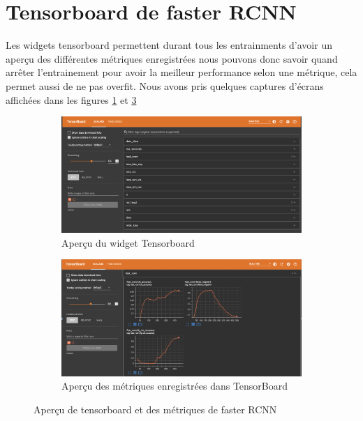 \section{Tensorboard de faster RCNN }\label{anal:train_rcnn}
Les widgets tensorboard permettent durant tous les entrainments d'avoir un aperçu des différentes métriques enregistrées nous pouvons donc savoir quand arrêter l'entrainement pour avoir la meilleur performance selon une métrique, cela permet aussi de ne pas overfit. Nous avons pris quelques captures d'écrans affichées dans les figures \ref{fig:tensorboard_overview} et \ref{fig:tensorboard_metric}
\begin{figure}[h!]
    \centering
    \begin{subfigure}[t]{0.49\textwidth}
        \centering
        \includegraphics[width=\textwidth]{images/tensorboard_large.png}
        \caption{Aperçu du widget Tensorboard}
        \label{fig:tensorboard_overview}
    \end{subfigure}
    \begin{subfigure}[t]{0.49\textwidth}
        \centering
        \includegraphics[width=\textwidth]{images/tensorboard_metric.png}
        \caption{Aperçu des métriques enregistrées dans TensorBoard}
        \label{fig:tensorboard_metric}
    \end{subfigure}
    \caption{Aperçu de tensorboard et des métriques de faster RCNN}
\end{figure}
